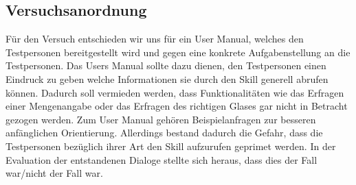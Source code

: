 \documentclass[12pt,letterpaper]{article}
\begin{document}
\subsection{Versuchsanordnung}
Für den Versuch entschieden wir uns für ein User Manual, welches den Testpersonen bereitgestellt wird und gegen eine konkrete Aufgabenstellung an die Testpersonen. Das Users Manual sollte dazu dienen, den Testpersonen einen Eindruck zu geben welche Informationen sie durch den Skill generell abrufen können. Dadurch soll vermieden werden, dass Funktionalitäten wie das Erfragen einer Mengenangabe oder das Erfragen des richtigen Glases gar nicht in Betracht gezogen werden. Zum User Manual gehören Beispielanfragen zur besseren anfänglichen Orientierung. Allerdings bestand dadurch die Gefahr, dass die Testpersonen bezüglich ihrer Art den Skill aufzurufen geprimet werden.
In der Evaluation der entstandenen Dialoge stellte sich heraus, dass dies der Fall war/nicht der Fall war.
\\
 
\end{document}
